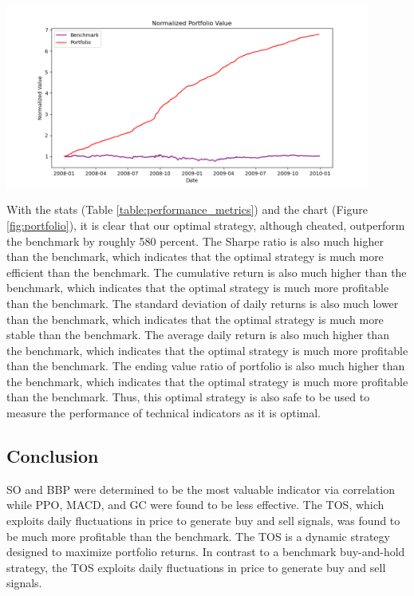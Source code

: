 \documentclass[
	letterpaper, %
]{jdf}
\begin{document}
\begin{jdffigure}
\includegraphics[height=6cm]{Figures/portfolio_value.png}%
\label{fig:portfolio}%
\end{jdffigure}
	
With the stats (Table \ref{table:performance_metrics}) and the chart (Figure \ref{fig:portfolio}), it is clear that our optimal strategy, although cheated, outperform the benchmark by roughly  580 percent. The Sharpe ratio is also much higher than the benchmark, which indicates that the optimal strategy is much more efficient than the benchmark. The cumulative return is also much higher than the benchmark, which indicates that the optimal strategy is much more profitable than the benchmark. The standard deviation of daily returns is also much lower than the benchmark, which indicates that the optimal strategy is much more stable than the benchmark. The average daily return is also much higher than the benchmark, which indicates that the optimal strategy is much more profitable than the benchmark. The ending value ratio of portfolio is also much higher than the benchmark, which indicates that the optimal strategy is much more profitable than the benchmark. Thus, this optimal strategy is also safe to be used to measure the performance of technical indicators as it is optimal.

\subsection{Conclusion}
SO and BBP were determined to be the most valuable indicator via correlation while PPO, MACD, and GC were found to be less effective. The TOS, which exploits daily fluctuations in price to generate buy and sell signals, was found to be much more profitable than the benchmark. The TOS is a dynamic strategy designed to maximize portfolio returns. In contrast to a benchmark buy-and-hold strategy, the TOS exploits daily fluctuations in price to generate buy and sell signals.
\end{document}

